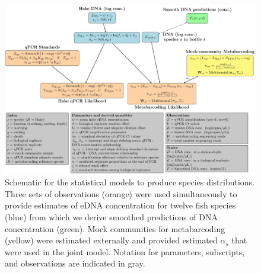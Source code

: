 \documentclass{article}
\begin{document}
\begin{figure}[tbhp] 
\centering
\includegraphics[width=16cm]{plots/DAG_v3.pdf} 
\caption{Schematic for the statistical models to produce species distributions. Three sets of observations (orange) were used simultaneously to provide estimates of eDNA concentration for  twelve fish species (blue) from which we derive smoothed predictions of DNA concentration (green). Mock communities for metabarcoding (yellow) were estimated externally and provided estimated $\alpha_s$ that were used in the joint model. Notation for parameters, subscripts, and observations are indicated in gray.}
\label{fig:DAG_v3}
\end{figure}

\end{document}
